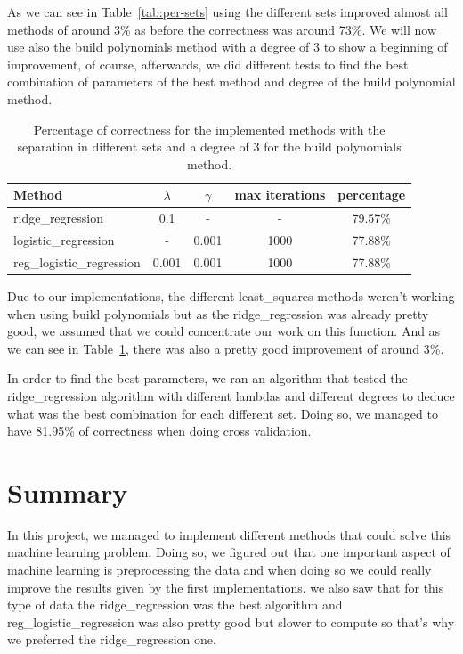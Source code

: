 \documentclass[10pt,conference,compsocconf]{IEEEtran}
\begin{document}
As we can see in Table~\ref{tab:per-sets} using the different sets improved almost all methods of around 3\% as before the correctness was around 73\%. We will now use also the build polynomials method with a degree of 3 to show a beginning of improvement, of course, afterwards, we did different tests to find the best combination of parameters of the best method and degree of the build polynomial method.

\begin{table}[h]
\centering
  \begin{tabular}[c]{|l||c|c|c||c|}
    \hline
    Method&$\lambda$&$\gamma$&max iterations&percentage\\
    \hline
    ridge\_regression&0.1&-&-&79.57\%\\
    \hline
    logistic\_regression&-&0.001&1000&77.88\%\\
    \hline
    reg\_logistic\_regression&0.001&0.001&1000&77.88\%\\
    \hline
  \end{tabular}
  \caption{Percentage of correctness for the implemented methods with the separation in different sets and a degree of 3 for the build polynomials method.}
  \label{tab:per-sets-poly}
\end{table}

Due to our implementations, the different least\_squares methods weren't working when using build polynomials but as the ridge\_regression was already pretty good, we assumed that we could concentrate our work on this function. And as we can see in Table~\ref{tab:per-sets-poly}, there was also a pretty good improvement of around 3\%.

In order to find the best parameters, we ran an algorithm that tested the ridge\_regression algorithm with different lambdas and different degrees to deduce what was the best combination for each different set. Doing so, we managed to have 81.95\% of correctness when doing cross validation.

\section{Summary}

In this project, we managed to implement different methods that could solve this machine learning problem. Doing so, we figured out that one important aspect of machine learning is preprocessing the data and when doing so we could really improve the results given by the first implementations. we also saw that for this type of data the ridge\_regression was the best algorithm and reg\_logistic\_regression was also pretty good but slower to compute so that's why we preferred the ridge\_regression one.



\end{document}
